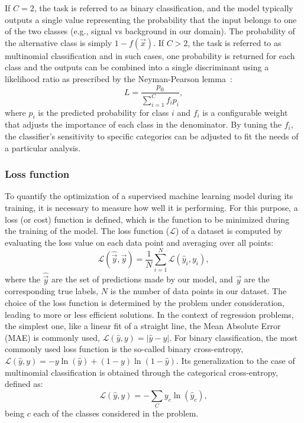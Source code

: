 If $C = 2$, the task is referred to as binary classification, and the model typically outputs a single value representing the probability that the input belongs to one of the two classes (e.g., signal vs background in our domain). The probability of the alternative class is simply $1 - f(\vec{x})$. If $C > 2$, the task is referred to as multinomial classification and in such cases, one probability is returned for each class and the outputs can be combined into a single discriminant using a likelihood ratio as prescribed by the Neyman-Pearson lemma~\cite{Neyman:1933wgr}:
\begin{equation}
    L = \frac{p_0}{\sum_{i=1}^C f_i p_i},
\end{equation}
where $p_i$ is the predicted probability for class $i$ and $f_i$ is a configurable weight that adjusts the importance of each class in the denominator. By tuning the $f_i$, the classifier’s sensitivity to specific categories can be adjusted to fit the needs of a particular analysis.

\subsubsection*{Loss function}

To quantify the optimization of a supervised machine learning model during its training, it is necessary to measure how well it is performing. For this purpose, a loss (or cost) function is defined, which is the function to be minimized during the training of the model.  
The loss function ($\mathcal{L}$) of a dataset is computed by evaluating the loss value on each data point and averaging over all points:
\begin{equation}
    \mathcal{L}(\hat{\vec{y}},\vec{y}) = \frac{1}{N}\sum^{N}_{i=1} \mathcal{L}(\hat{y}_{i},y_{i}),
\end{equation}
where the $\hat{\vec{y}}$ are the set of predictions made by our model, and ${\vec{y}}$ are the corresponding true labels, $N$ is the number of data points in our dataset. The choice of the loss function is determined by the problem under consideration, leading to more or less efficient solutions.
In the context of regression problems, the simplest one, like a linear fit of a straight line, the Mean Absolute Error (MAE) is commonly used, $\mathcal{L}(\hat{y},y) = |\hat{y} - y|$.
For binary classification, the most commonly used loss function is the so-called binary cross-entropy, $\mathcal{L}(\hat{y},y) = -y\ln(\hat{y}) + (1-y)\ln(1-\hat{y})$.
Its generalization to the case of multinomial classification is obtained through the categorical cross-entropy, defined as:
\begin{equation}
    \mathcal{L}(\hat{y},y) = - \sum_{C} y_{c}\ln(\hat{y}_{c}),
\end{equation}
being $c$ each of the classes considered in the problem.

